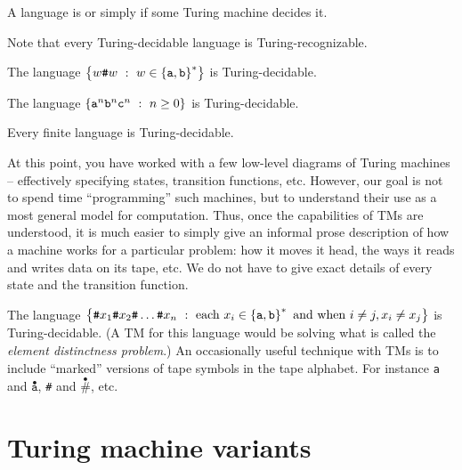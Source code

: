 \documentclass[twoside,letterpaper,openany]{book}
\begin{document}
\begin{defn}
A language is  or simply  if some Turing machine decides it.

Note that every Turing-decidable language is Turing-recognizable.
\end{defn}

\begin{stmt}
The language $\left\lbrace w\texttt{\#}w\ :\ w \in \left\lbrace \texttt{a}, \texttt{b} \right\rbrace^{*} \right\rbrace$ is Turing-decidable.
\end{stmt}

\begin{stmt}
The language $\left\lbrace \texttt{a}^n \texttt{b}^n \texttt{c}^n\ :\  n \geq 0  \right\rbrace$ is Turing-decidable.
\end{stmt}

\begin{stmt}
Every finite language is Turing-decidable.
\end{stmt}


\begin{discussion}
At this point, you have worked with a few low-level diagrams of Turing machines -- effectively specifying states, transition functions, etc. However, our goal is not to spend time ``programming'' such machines, but to understand their use as a most general model for computation. Thus, once the capabilities of TMs are understood, it is much easier to simply give an informal prose description of how a machine works for a particular problem: how it moves it head, the ways it reads and writes data on its tape, etc. We do not have to give exact details of every state and the transition function.
\end{discussion}

\begin{stmt}
The language $\left\lbrace \texttt{\#}x_1\texttt{\#}x_2\texttt{\#}\ldots\texttt{\#}x_n\ :\ \textrm{each}~x_i \in \left\lbrace \texttt{a}, \texttt{b} \right\rbrace^{*}
	~\textrm{and when}~ i \neq j, x_i \neq x_j \right\rbrace$ is Turing-decidable. (A TM for this language would be solving what is called the \emph{element distinctness problem}.)
\hint An occasionally useful technique with TMs is to include ``marked'' versions of tape symbols in the tape alphabet. For instance \texttt{a} and $\overset{\bullet}{\texttt{a}}$, \texttt{\#} and $\overset{\bullet}{\texttt{\#}}$, etc.
\end{stmt}

\section{Turing machine variants}
\end{document}
